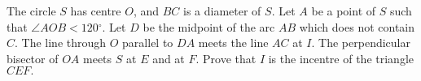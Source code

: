 The circle $S$ has centre $O$,  and $BC$ is a diameter of $S$. Let $A$ be a point of $S$ such that $\angle AOB<120{{}^\circ}$.  Let $D$ be the midpoint of the arc $AB$ which does not contain $C$. The line through $O$ parallel to $DA$ meets the line $AC$ at $I$. The perpendicular bisector of $OA$ meets $S$ at $E$ and at $F$. Prove that $I$ is the incentre of the triangle $CEF.$